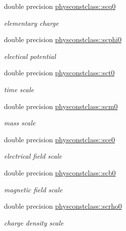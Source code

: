 \begin{DoxyCompactItemize}
double precision \mbox{\hyperlink{namespacephysconstclass_ad43d82a4ecebf026bbb5c900d378b625}{physconstclass\+::scq0}}
\begin{DoxyCompactList}\small\item\em elementary charge \end{DoxyCompactList}\item 
double precision \mbox{\hyperlink{namespacephysconstclass_a6af6ed4a46c6f27b3041a94ca6df16b0}{physconstclass\+::scphi0}}
\begin{DoxyCompactList}\small\item\em electical potential \end{DoxyCompactList}\item 
double precision \mbox{\hyperlink{namespacephysconstclass_a3f034deff4a556e270ebc5eb27a3bca3}{physconstclass\+::sct0}}
\begin{DoxyCompactList}\small\item\em time scale \end{DoxyCompactList}\item 
double precision \mbox{\hyperlink{namespacephysconstclass_a6b0e64e20a4a76b514d7009c40e0596a}{physconstclass\+::scm0}}
\begin{DoxyCompactList}\small\item\em mass scale \end{DoxyCompactList}\item 
double precision \mbox{\hyperlink{namespacephysconstclass_a0138d4fbdcbcfcfae9235e40adef3dc2}{physconstclass\+::sce0}}
\begin{DoxyCompactList}\small\item\em electrical field scale \end{DoxyCompactList}\item 
double precision \mbox{\hyperlink{namespacephysconstclass_aa4295e4df81160129b34fec287bdc244}{physconstclass\+::scb0}}
\begin{DoxyCompactList}\small\item\em magnetic field scale \end{DoxyCompactList}\item 
double precision \mbox{\hyperlink{namespacephysconstclass_a9afe1d266547fa8e36280a8788e2a909}{physconstclass\+::scrho0}}
\begin{DoxyCompactList}\small\item\em charge density scale \end{DoxyCompactList}\end{DoxyCompactItemize}
